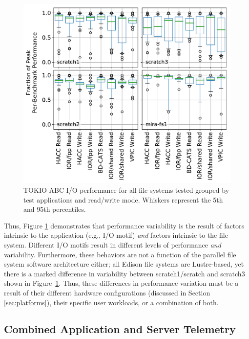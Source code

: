 \begin{figure}[t]
    \centering
    \includegraphics[width=1.0\columnwidth]{figs/perf-boxplots.pdf}
    \caption{TOKIO-ABC I/O performance for all file systems tested grouped by test
    applications and read/write mode.  Whiskers represent the 5th and 95th
    percentiles.}
    \label{fig:perf-summary-boxplots-motif}
\vspace{-.2in}
\end{figure}

Thus, Figure \ref{fig:perf-summary-boxplots-motif} demonstrates that 
performance variability is the result of factors intrinsic to the application
(e.g., I/O motif) \emph{and} factors intrinsic to the file system. 
Different I/O motifs result in different levels of performance \emph{and} variability.
Furthermore, these behaviors are not a function of the parallel file system software architecture either; all Edison file systems are Lustre-based, yet there is a marked difference in variability between scratch1/scratch and scratch3 shown in Figure~\ref{fig:perf-summary-boxplots-motif}.
Thus, these differences in performance variation must be a result of their different hardware configurations (discussed in Section \ref{sec:platforms}), their specific user workloads, or a combination of both.

\subsection{Combined Application and Server Telemetry} \label{sec:results/combining}

